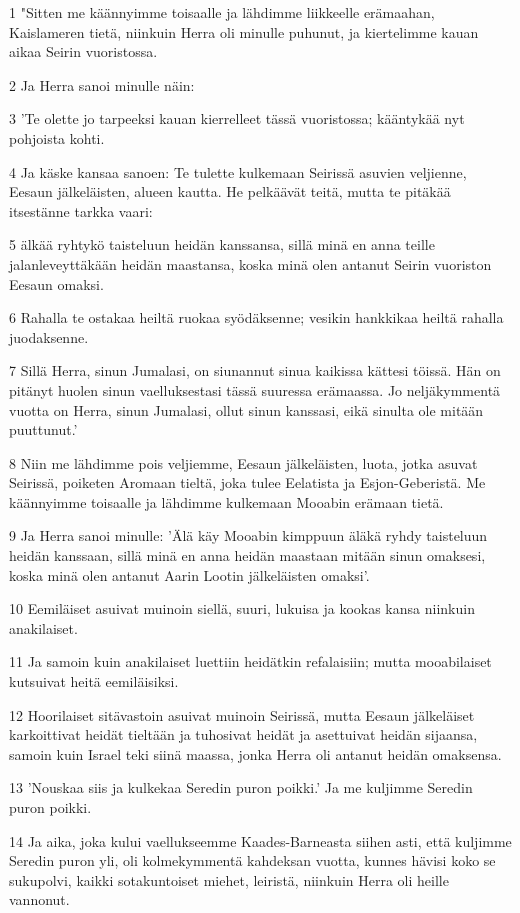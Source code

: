 \par 1 "Sitten me käännyimme toisaalle ja lähdimme liikkeelle erämaahan, Kaislameren tietä, niinkuin Herra oli minulle puhunut, ja kiertelimme kauan aikaa Seirin vuoristossa.
\par 2 Ja Herra sanoi minulle näin:
\par 3 'Te olette jo tarpeeksi kauan kierrelleet tässä vuoristossa; kääntykää nyt pohjoista kohti.
\par 4 Ja käske kansaa sanoen: Te tulette kulkemaan Seirissä asuvien veljienne, Eesaun jälkeläisten, alueen kautta. He pelkäävät teitä, mutta te pitäkää itsestänne tarkka vaari:
\par 5 älkää ryhtykö taisteluun heidän kanssansa, sillä minä en anna teille jalanleveyttäkään heidän maastansa, koska minä olen antanut Seirin vuoriston Eesaun omaksi.
\par 6 Rahalla te ostakaa heiltä ruokaa syödäksenne; vesikin hankkikaa heiltä rahalla juodaksenne.
\par 7 Sillä Herra, sinun Jumalasi, on siunannut sinua kaikissa kättesi töissä. Hän on pitänyt huolen sinun vaelluksestasi tässä suuressa erämaassa. Jo neljäkymmentä vuotta on Herra, sinun Jumalasi, ollut sinun kanssasi, eikä sinulta ole mitään puuttunut.'
\par 8 Niin me lähdimme pois veljiemme, Eesaun jälkeläisten, luota, jotka asuvat Seirissä, poiketen Aromaan tieltä, joka tulee Eelatista ja Esjon-Geberistä. Me käännyimme toisaalle ja lähdimme kulkemaan Mooabin erämaan tietä.
\par 9 Ja Herra sanoi minulle: 'Älä käy Mooabin kimppuun äläkä ryhdy taisteluun heidän kanssaan, sillä minä en anna heidän maastaan mitään sinun omaksesi, koska minä olen antanut Aarin Lootin jälkeläisten omaksi'.
\par 10 Eemiläiset asuivat muinoin siellä, suuri, lukuisa ja kookas kansa niinkuin anakilaiset.
\par 11 Ja samoin kuin anakilaiset luettiin heidätkin refalaisiin; mutta mooabilaiset kutsuivat heitä eemiläisiksi.
\par 12 Hoorilaiset sitävastoin asuivat muinoin Seirissä, mutta Eesaun jälkeläiset karkoittivat heidät tieltään ja tuhosivat heidät ja asettuivat heidän sijaansa, samoin kuin Israel teki siinä maassa, jonka Herra oli antanut heidän omaksensa.
\par 13 'Nouskaa siis ja kulkekaa Seredin puron poikki.' Ja me kuljimme Seredin puron poikki.
\par 14 Ja aika, joka kului vaellukseemme Kaades-Barneasta siihen asti, että kuljimme Seredin puron yli, oli kolmekymmentä kahdeksan vuotta, kunnes hävisi koko se sukupolvi, kaikki sotakuntoiset miehet, leiristä, niinkuin Herra oli heille vannonut.
